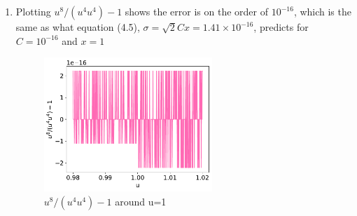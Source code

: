 \documentclass{article}
\begin{document}
\begin{enumerate}
\begin{enumerate}
    \item Plotting $u^8/(u^4u^4)-1$ shows the error is on the order of $10^{-16}$, which is the same as what equation (4.5), $\sigma = \sqrt{2}C x = 1.41\times10^{-16}$, predicts for $C=10^{-16}$ and $x=1$
    \begin{figure}[h]
        \centering 
        \includegraphics[width=0.6\textwidth]{3d.pdf}
        \caption{$u^8/(u^4u^4) - 1$ around u=1}
        \label{fig:3d}
    \end{figure}

\end{enumerate}

\end{enumerate}
\end{document}
